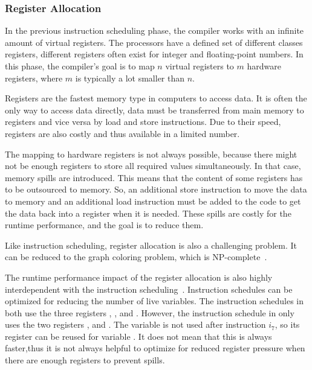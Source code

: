 


\subsubsection{Register Allocation}
In the previous instruction scheduling phase, the compiler works with an infinite amount of virtual registers.
The processors have a defined set of different classes registers, \eg different registers often exist for integer and floating-point numbers.
In this phase, the compiler's goal is to map $n$ virtual registers to $m$ hardware registers, where $m$ is typically a lot smaller than $n$.

Registers are the fastest memory type in computers to access data.
It is often the only way to access data directly, \ie data must be transferred from main memory to registers and vice versa by load and store instructions.
Due to their speed, registers are also costly and thus available in a limited number.

The mapping to hardware registers is not always possible, because there might not be enough registers to store all required values simultaneously.
In that case, memory spills are introduced.
This means that the content of some registers has to be outsourced to memory.
So, an additional store instruction to move the data to memory and an additional load instruction must be added to the code to get the data back into a register when it is needed.
These spills are costly for the runtime performance, and the goal is to reduce them.

Like instruction scheduling, register allocation is also a challenging problem.
It can be reduced to the graph coloring problem, which is NP-complete~\cite{lavrov1962store}.

The runtime performance impact of the register allocation is also highly interdependent with the instruction scheduling~\cite{goodman1988code}.
Instruction schedules can be optimized for reducing the number of live variables.
The instruction schedules in  both use the three registers , , and .
However, the instruction schedule in  only uses the two registers , and .
The variable  is not used after instruction $i_7$, so its register  can be reused for variable .
It does not mean that this is always faster,\eg thus it is not always helpful to optimize for reduced register pressure when there are enough registers to prevent spills.

